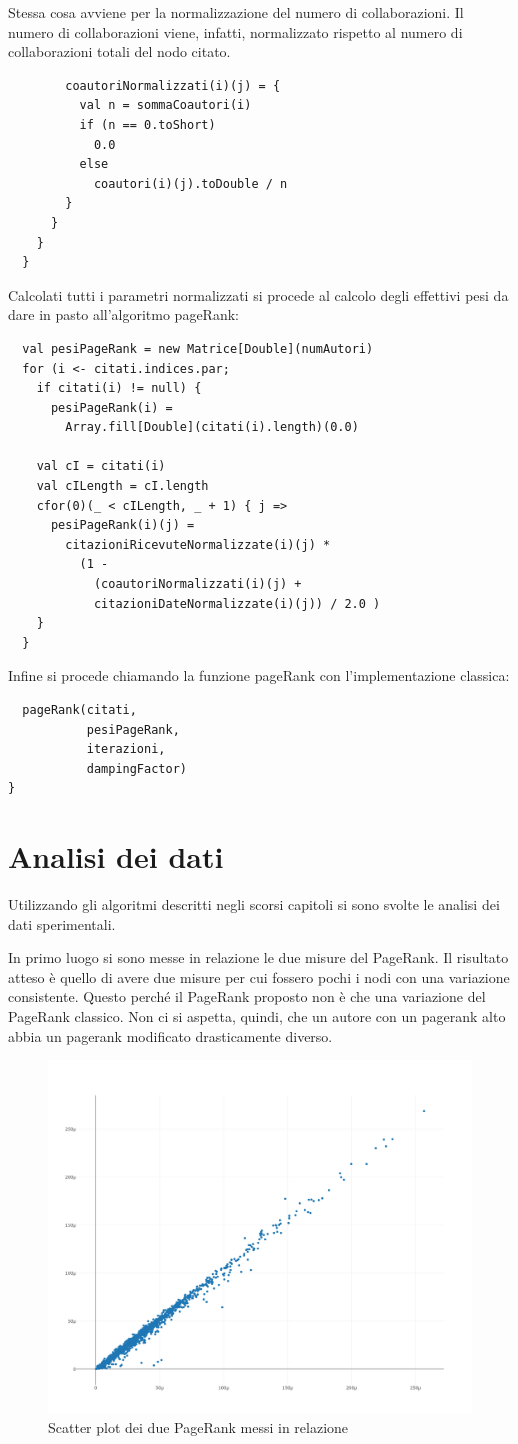 \documentclass[a4paper, 12pt]{article}
\let\oldsection\section
\renewcommand\section{\clearpage\oldsection}
\begin{document}
Stessa cosa avviene per la normalizzazione del numero di collaborazioni. Il numero di collaborazioni viene, infatti, normalizzato rispetto al numero di collaborazioni totali del nodo citato.
\begin{lstlisting} 
        coautoriNormalizzati(i)(j) = {
          val n = sommaCoautori(i)
          if (n == 0.toShort) 
            0.0 
          else 
            coautori(i)(j).toDouble / n
        }
      }
    }
  }
\end{lstlisting}
Calcolati tutti i parametri normalizzati si procede al calcolo degli effettivi pesi da dare in pasto all'algoritmo pageRank:
\begin{lstlisting}
  val pesiPageRank = new Matrice[Double](numAutori)
  for (i <- citati.indices.par; 
    if citati(i) != null) {
      pesiPageRank(i) = 
        Array.fill[Double](citati(i).length)(0.0)

    val cI = citati(i)
    val cILength = cI.length
    cfor(0)(_ < cILength, _ + 1) { j =>
      pesiPageRank(i)(j) =
        citazioniRicevuteNormalizzate(i)(j) * 
          (1 - 
            (coautoriNormalizzati(i)(j) +
            citazioniDateNormalizzate(i)(j)) / 2.0 )
    }
  }
\end{lstlisting}
Infine si procede chiamando la funzione pageRank con l'implementazione classica:
\begin{lstlisting}
  pageRank(citati,
           pesiPageRank,
           iterazioni,
           dampingFactor)
}
\end{lstlisting}

\section{Analisi dei dati}
Utilizzando gli algoritmi descritti negli scorsi capitoli si sono svolte le analisi dei dati sperimentali.

In primo luogo si sono messe in relazione le due misure del PageRank. Il risultato atteso è quello di avere due misure per cui fossero pochi i nodi con una variazione consistente. Questo perché il PageRank proposto non è che una variazione del PageRank classico. Non ci si aspetta, quindi, che un autore con un pagerank alto abbia un pagerank modificato drasticamente diverso.
\begin{figure}[H]
  \includegraphics[width=0.7\linewidth]{images/grafico-1.png}
  \caption{Scatter plot dei due PageRank messi in relazione}
\end{figure}
\end{document}
